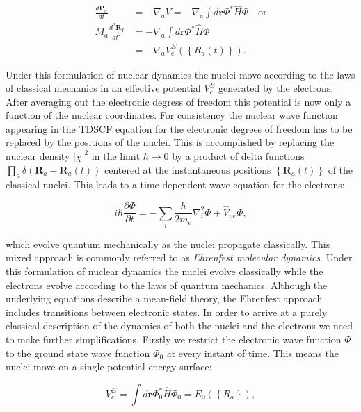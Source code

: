 \begin{equation}
    \begin{split}
        \frac{d\bm{P}_a}{dt}
    &= -\nabla_a V
    = -\nabla_a \int d\bm{r} \Phi^* \hat{H} \Phi \quad \text{or} \\
        M_a\frac{d^2 \bm{R}_I}{dt^2}
    &= -\nabla_a \int d\bm{r} \Phi^* \hat{H} \Phi \\
    &= -\nabla_a V_e^E \left(\left\{ R_a(t) \right\}\right) .
    \end{split}
\end{equation}

Under this formulation of nuclear dynamics
the nuclei move according to the laws of classical
mechanics in an effective potential $V_e^E$ generated
by the electrons.
After averaging out the electronic degress of freedom
this potential is now only a function of the nuclear coordinates.
For consistency the nuclear wave function appearing
in the TDSCF equation for the electronic
degrees of freedom has to be replaced by the positions
of the nuclei.
This is accomplished by replacing the nuclear density 
$\left| \chi \right|^2$ in the limit $\hbar \rightarrow 0$
by a product of delta functions
$ \prod_a \delta (\bm{R}_a - \bm{R}_a(t)) $ centered
at the instantaneous positions $\left\{ \bm{R}_a(t) \right\}$
of the classical nuclei.
This leads to a time-dependent wave equation
for the electrons:

\begin{equation}
 i\hbar\frac{\partial \Phi}{\partial t} =
    -\sum_i \frac{\hbar}{2m_e} \nabla_i^2 \Phi
    + \hat{V}_{ne} \Phi , 
\end{equation}

which evolve quantum mechanically as the nuclei propagate
classically. This mixed approach is commonly referred to as
\textit{Ehrenfest molecular dynamics}.
Under this formulation of nuclear dynamics the
nuclei evolve classically while the electrons
evolve according to the laws of quantum mechanics.
Although the underlying equations describe a mean-field
theory, the Ehrenfest approach includes transitions
between electronic states.
In order to arrive at a purely classical description of the
dynamics of both the nuclei and the electrons
we need to make further simplifications.
Firstly we restrict the electronic wave function $\Phi$
to the ground state wave function $\Phi_0$
at every instant of time. 
This means the nuclei move on a single potential energy surface:

\begin{equation}
 V_e^E = \int d\bm{r} \Phi_0^* \hat{H} \Phi_0 
    = E_0 \left(\left\{ R_a \right\}\right) , 
\end{equation}

